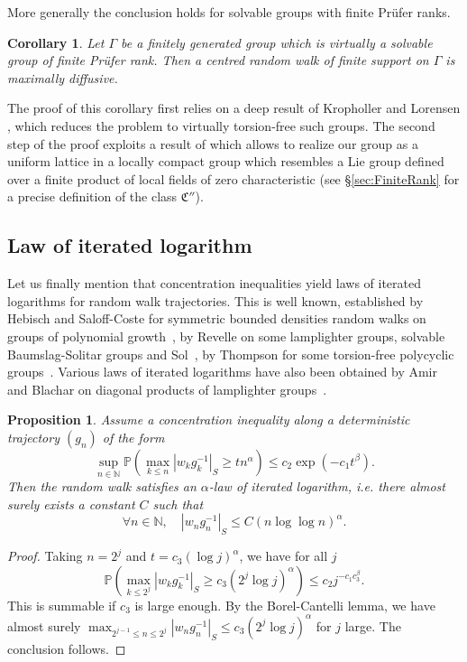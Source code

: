 \documentclass[11pt,leqno]{article}
\theoremstyle{plain}
\newtheorem{corollary}[theorem]{Corollary}
\newtheorem{proposition}[theorem]{Proposition}
\theoremstyle{definition}
\theoremstyle{remark}
\numberwithin{equation}{section}
\begin{document}
More generally the conclusion holds for solvable groups with finite Pr\"ufer ranks.
\begin{corollary}\label{cor:finireRank} Let $\Gamma$ be a finitely generated group which
is virtually a solvable group of finite Prüfer rank. Then a centred
random walk of finite support on $\Gamma$ is maximally diffusive.
\end{corollary}
The proof of this corollary first relies on a deep result of Kropholler and Lorensen \cite{KroLor}, which reduces the problem to virtually torsion-free such groups. The second step of the proof exploits a result of \cite{CT} which allows to realize our group as a uniform lattice in a locally compact group which resembles a Lie group defined over a finite product of local fields of zero characteristic (see \S \ref{sec:FiniteRank} for a precise definition of the class $\mathfrak{C}''$). 

\subsection{Law of iterated logarithm}

Let us finally mention that concentration inequalities yield laws of iterated logarithms for random walk trajectories. This is well known, established by Hebisch and Saloff-Coste for symmetric bounded densities random walks on groups of polynomial growth~\cite{HebishSaloff}, by Revelle on some lamplighter groups, solvable Baumslag-Solitar groups and Sol~\cite{Revelle}, by Thompson for some torsion-free polycyclic groups~\cite{Thompson}. Various laws of iterated logarithms have also been obtained by Amir and Blachar on diagonal products of lamplighter groups~\cite{AmirBlachar}.

\begin{proposition}
Assume a concentration inequality along a deterministic trajectory $(g_n)$ of the form
\[
\sup_{n\in \mathbb{N}}\mathbb{P}\left(\max_{k\leq n}|w_{k}g_k^{-1}|_{S}\geq tn^{\alpha}\right)\leq c_2\exp(-c_1t^{\beta}).
\]
Then the random walk satisfies an $\alpha$-law of iterated logarithm, i.e. there almost surely exists a constant $C$ such that
\[
\forall n \in \mathbb{N}, \quad |w_ng_n^{-1}|_S \le C\left(n \log \log n\right)^\alpha.
\]
\end{proposition}

\begin{proof}
Taking $n=2^j$ and $t=c_3(\log j)^\alpha$, we have for all $j$
\[
\mathbb{P}\left(\max_{k\leq 2^j}|w_{k}g_k^{-1}|_{S}\geq c_3(2^j\log j)^\alpha\right)\leq c_2j^{-c_1c_3^\beta}.
\]
This is summable if $c_3$ is large enough. By the Borel-Cantelli lemma, we have almost surely $\max_{2^{j-1} \le n \le 2^j} |w_ng_n^{-1}|_S\le c_3(2^j\log j)^\alpha$ for $j$ large. The conclusion follows.
\end{proof}
\end{document}
